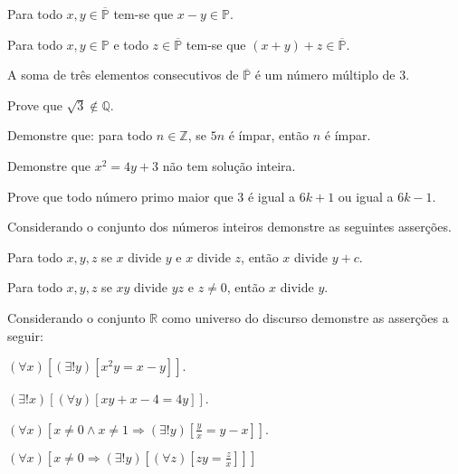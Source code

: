 \begin{exerList}
	\item Para todo $x, y \in \overline{\mathbb{P}}$ tem-se que $x - y \in \mathbb{P}$.
	\item Para todo $x, y\in \mathbb{P}$ e todo $z \in \overline{\mathbb{P}}$ tem-se que $(x + y) + z \in \overline{\mathbb{P}}$.
	\item A soma de três elementos consecutivos de $\overline{\mathbb{P}}$ é um número múltiplo de $3$.
\end{exerList}

\begin{questao}\label{test:Demosntracoes9}
	Prove que $\sqrt{3} \notin \mathbb{Q}$.
\end{questao}

\begin{questao}\label{test:Demosntracoes10}
	Demonstre que: para todo $n \in \mathbb{Z}$, se $5n$ é ímpar, então $n$ é ímpar.
\end{questao}

\begin{questao}\label{test:Demosntracoes11}
	Demonstre que $x^2 = 4y + 3$ não tem solução inteira.
\end{questao}

\begin{questao}\label{test:Demosntracoes12}
	Prove que todo número primo maior que $3$ é igual a $6k+1$ ou igual a $6k-1$.
\end{questao}

\begin{questao}\label{test:Demosntracoes13}
	Considerando o conjunto dos números inteiros demonstre as seguintes asserções.
\end{questao}

\begin{exerList}
	\item Para todo $x, y, z$ se $x$ divide $y$ e $x$ divide $z$, então $x$ divide $y + c$.
	\item Para todo $x, y, z$ se $xy$ divide $yz$ e $z \neq 0$, então $x$ divide $y$.
\end{exerList}

\begin{questao}\label{test:Demosntracoes14}
	Considerando o conjunto $ \mathbb{R}$ como universo do discurso demonstre as asserções a seguir:
\end{questao}

\begin{exerList}
	\item $(\forall x)[(\exists ! y)[x^2y = x - y]]$.
	\item $(\exists ! x)[(\forall y)[xy + x - 4 = 4y]]$.
	\item $(\forall x)[x \neq 0 \land x \neq 1 \Rightarrow (\exists! y)[\frac{y}{x} = y-x]]$.
	\item $(\forall x)[x \neq 0 \Rightarrow (\exists ! y)[(\forall z)[zy = \frac{z}{x}]]]$
\end{exerList}

